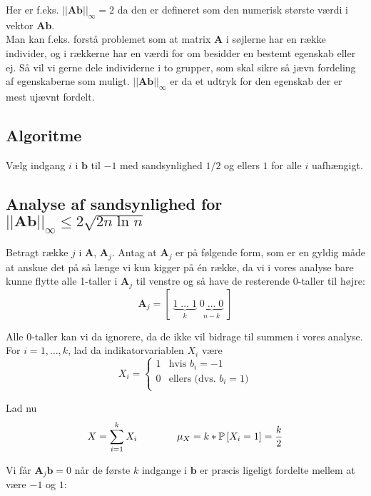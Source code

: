 Her er f.eks. $||\mathbf{Ab}||_\infty = 2$ da den er defineret som den numerisk største værdi i vektor $\mathbf{Ab}$.\\

Man kan f.eks. forstå problemet som at matrix $\mathbf A$ i søjlerne har en række individer, og i rækkerne har en værdi for om besidder en bestemt egenskab eller ej. Så vil vi gerne dele individerne i to grupper, som skal sikre så jævn fordeling af egenskaberne som muligt. $||\mathbf{Ab}||_\infty$ er da et udtryk for den egenskab der er mest ujævnt fordelt.






\subsection{Algoritme}
Vælg indgang $i$ i $\mathbf b$ til $-1$ med sandsynlighed $1/2$ og ellers $1$ for alle $i$ uafhængigt.






\subsection{Analyse af sandsynlighed for $||\mathbf{Ab}||_\infty \leq 2 \sqrt{2 n \ln n}$}
Betragt række $j$ i $\mathbf A$, $\mathbf A_j$. Antag at $\mathbf A_j$ er på følgende form, som er en gyldig måde at anskue det på så længe vi kun kigger på én række, da vi i vores analyse bare kunne flytte alle 1-taller i $\mathbf A_j$ til venstre og så have de resterende 0-taller til højre:
$$
\mathbf A_j = [ \; \underbrace{1 \; \dots \; 1}_{k} \; \underbrace{0 \; \dots \; 0}_{n-k} \; ]
$$

Alle 0-taller kan vi da ignorere, da de ikke vil bidrage til summen i vores analyse.\\
For $i = 1, \dots, k$, lad da indikatorvariablen $X_i$ være
$$
X_i
=
\begin{cases}
	1 & \text{hvis $b_i = -1$}\\
	0 & \text{ellers (dvs. $b_i = 1$)}\\
\end{cases}
$$

Lad nu
$$
X = \sum_{i=1}^k X_i \quad\quad\quad\quad \mu_X = k * \P{X_i = 1} = \frac{k}{2}
$$


Vi får $\mathbf A_j \mathbf b = 0$ når de første $k$ indgange i $\mathbf b$ er præcis ligeligt fordelte mellem at være $-1$ og $1$:

